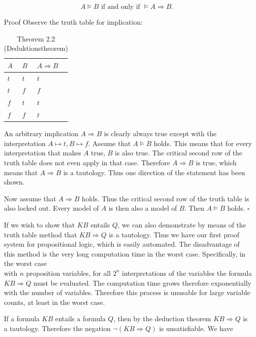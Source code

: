\documentclass[10pt]{article}
\begin{document}
$$
A \models B \text { if and only if } \models A \Rightarrow B \text {. }
$$

Proof Observe the truth table for implication:

\begin{table}[h]
\begin{center}
\captionsetup{labelformat=empty}
\caption{Theorem 2.2 (Deduktionstheorem)}
\begin{tabular}{lll}
$A$ & $B$ & $A \Rightarrow B$ \\
\hline
$t$ & $t$ & $t$ \\
\hline
$t$ & $f$ & $f$ \\
\hline
$f$ & $t$ & $t$ \\
\hline
$f$ & $f$ & $t$ \\
\hline
\end{tabular}
\end{center}
\end{table}

An arbitrary implication $A \Rightarrow B$ is clearly always true except with the interpretation $A \longmapsto t, B \longmapsto f$. Assume that $A \models B$ holds. This means that for every interpretation that makes $A$ true, $B$ is also true. The critical second row of the truth table does not even apply in that case. Therefore $A \Rightarrow B$ is true, which means that $A \Rightarrow B$ is a tautology. Thus one direction of the statement has been shown.

Now assume that $A \Rightarrow B$ holds. Thus the critical second row of the truth table is also locked out. Every model of $A$ is then also a model of $B$. Then $A \models B$ holds. \(\square\)

If we wish to show that $K B$ entails $Q$, we can also demonstrate by means of the truth table method that $K B \Rightarrow Q$ is a tautology. Thus we have our first proof system for propositional logic, which is easily automated. The disadvantage of this method is the very long computation time in the worst case. Specifically, in the worst case\\
with $n$ proposition variables, for all $2^{n}$ interpretations of the variables the formula $K B \Rightarrow Q$ must be evaluated. The computation time grows therefore exponentially with the number of variables. Therefore this process is unusable for large variable counts, at least in the worst case.

If a formula $K B$ entails a formula $Q$, then by the deduction theorem $K B \Rightarrow Q$ is a tautology. Therefore the negation $\neg(K B \Rightarrow Q)$ is unsatisfiable. We have
\end{document}
